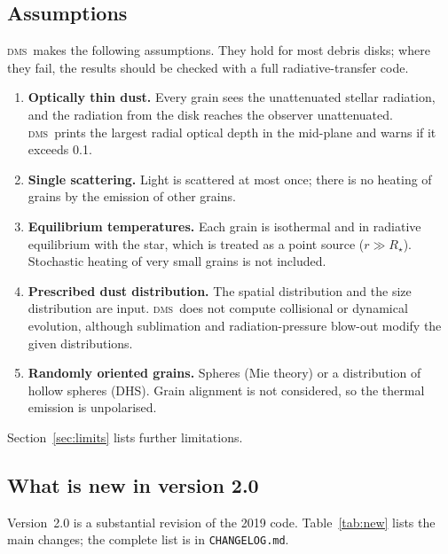 \documentclass[11pt,a4paper]{article}
\newcommand{\dms}{\textsc{dms}}
\newcommand{\code}[1]{\texttt{#1}}
\begin{document}
\subsection{Assumptions}
\label{sec:assumptions}

\dms\ makes the following assumptions. They hold for most debris disks; where they fail, the
results should be checked with a full radiative-transfer code.
\begin{enumerate}
\item \textbf{Optically thin dust.} Every grain sees the unattenuated stellar radiation, and the
      radiation from the disk reaches the observer unattenuated. \dms\ prints the largest radial
      optical depth in the mid-plane and warns if it exceeds 0.1.
\item \textbf{Single scattering.} Light is scattered at most once; there is no heating of grains
      by the emission of other grains.
\item \textbf{Equilibrium temperatures.} Each grain is isothermal and in radiative equilibrium
      with the star, which is treated as a point source ($r\gg R_\star$). Stochastic heating of
      very small grains is not included.
\item \textbf{Prescribed dust distribution.} The spatial distribution and the size distribution
      are input. \dms\ does not compute collisional or dynamical evolution, although sublimation
      and radiation-pressure blow-out modify the given distributions.
\item \textbf{Randomly oriented grains.} Spheres (Mie theory) or a distribution of hollow
      spheres (DHS). Grain alignment is not considered, so the thermal emission is unpolarised.
\end{enumerate}
Section~\ref{sec:limits} lists further limitations.

\subsection{What is new in version 2.0}

Version~2.0 is a substantial revision of the 2019 code. Table~\ref{tab:new} lists the main
changes; the complete list is in \code{CHANGELOG.md}.
\end{document}
